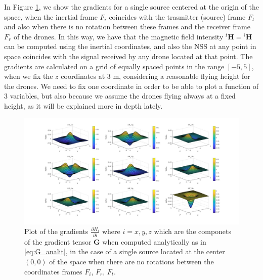 In Figure \ref{fig:gradients_single_anal}, we show the gradients for a single
source centered at the origin of the space, when the inertial frame 
$F_i$ coincides with the trasmitter (source) frame $F_t$ and also when there 
is no rotation between these frames and the receiver frame $F_r$ of the drones. 
In this way, we have that the magnetic field intensity ${}^t \mathbf{H} = {}^i \mathbf{H}$
can be computed using the inertial coordinates, and also the
NSS at any point in space coincides with the signal received by 
any drone located at that point.
The gradients are calculated on a grid of equally spaced points in the range $[-5, 5]$, when we fix the $z$ coordinates
at 3 m, considering a reasonable flying height for the drones.
We need to fix one coordinate in order to be able to plot 
a function of 3 variables, but also because we assume the drones
flying always at a fixed height, as it will be explained more in 
depth lately.   
\begin{figure}
\centering
\includegraphics[width=\textwidth]{images/gradients_single_anal.jpg}
\caption{Plot of the gradients $\frac{\partial H_i}{\partial i}$ where $i = x, y, z$
which are the componets of the gradient tensor $\mathbf{G}$
when computed analytically as in \ref{eq:G_analit}, in the case of a single source located
at the center $(0,0)$ of the space when there are no rotations between the coordinates
frames $F_i$, $F_r$, $F_t$.}
\label{fig:gradients_single_anal}
\end{figure}

